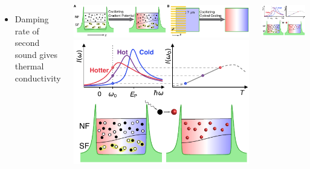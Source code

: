 \documentclass[26pt, paperwidth=36in,paperheight=48in]{tikzposter} %
\begin{document}
\begin{columns}
{\begin{minipage}{0.21\textwidth}
\begin{itemize}
		
		\item Damping rate of second sound gives thermal conductivity
	\end{itemize}
\end{minipage}
\hspace{2cm}
\begin{minipage}{0.15\textwidth}
	\vspace{-0.5cm}
	\centering
	\hspace{0.5cm}
	\includegraphics[width=1.7\textwidth,
	trim=9.4cm 0cm 0cm 0cm,clip]{figures/SecondSoundExcitation.pdf}
	\centering
	\includegraphics[width=1.7\textwidth,
	trim=0cm 3.2cm 0cm 0cm,clip]{figures/local_thermometer.pdf}
\end{minipage}
	


\vspace{-1.5cm}
\begin{minipage}{0.15\textwidth}
	\includegraphics[width=10cm,
	trim=0cm 0cm 4.4cm 3.2cm,clip]{figures/local_thermometer.pdf}\\
	

\end{minipage}}
\end{columns}
\end{document}
